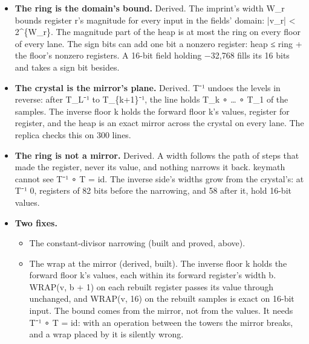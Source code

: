 \begin{itemize}
\begin{itemize}
\item The heap pinches at the crystal by 12× for the ramp, 3.2× at ±8 and 1.3× at ±1,024, and not at all for noise.
\item The live bits peak at the last cut (5,079), not at the crystal (1,656).
\item 128 samples at 7 levels are refused: 93-bit registers overflow the 256-limb file.
\end{itemize}
\item \textbf{The ring is the domain's bound.} Derived. The imprint's width W\_\allowbreak{}r bounds register r's magnitude for every input in the fields' domain: |v\_\allowbreak{}r| < 2\textasciicircum{}\{W\_\allowbreak{}r\}. The magnitude part of the heap is at most the ring on every floor of every lane. The sign bits can add one bit a nonzero register: heap ≤ ring + the floor's nonzero registers. A 16-bit field holding −32,768 fills its 16 bits and takes a sign bit besides.
\item \textbf{The crystal is the mirror's plane.} Derived. T⁻¹ undoes the levels in reverse: after T\_\allowbreak{}L⁻¹ to T\_\allowbreak{}\{k+1\}⁻¹, the line holds T\_\allowbreak{}k ∘ … ∘ T\_\allowbreak{}1 of the samples. The inverse floor k holds the forward floor k's values, register for register, and the heap is an exact mirror across the crystal on every lane. The replica checks this on 300 lines.
\item \textbf{The ring is not a mirror.} Derived. A width follows the path of steps that made the register, never its value, and nothing narrows it back. keymath cannot see T⁻¹ ∘ T = id. The inverse side's widths grow from the crystal's: at T⁻¹ 0, registers of 82 bits before the narrowing, and 58 after it, hold 16-bit values.
\item \textbf{Two fixes.}

\begin{itemize}
\item The constant-divisor narrowing (built and proved, above).
\item The wrap at the mirror (derived, built). The inverse floor k holds the forward floor k's values, each within its forward register's width b. WRAP(v, b + 1) on each rebuilt register passes its value through unchanged, and WRAP(v, 16) on the rebuilt samples is exact on 16-bit input. The bound comes from the mirror, not from the values. It needs T⁻¹ ∘ T = id: with an operation between the towers the mirror breaks, and a wrap placed by it is silently wrong.


\end{itemize}
\end{itemize}
